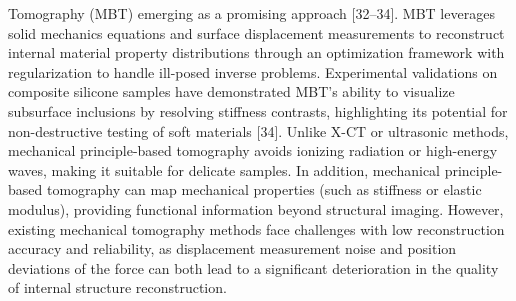 \documentclass[11pt]{article}
\begin{document}
{Tomography (MBT) emerging as a promising approach [32--34]. MBT
leverages solid mechanics equations and surface displacement
measurements to reconstruct internal material property distributions
through an optimization framework with regularization to handle
ill-posed inverse problems. Experimental validations on composite
silicone samples have demonstrated MBT's ability to visualize
subsurface inclusions by resolving stiffness contrasts, highlighting
its potential for non-destructive testing of soft materials [34].
Unlike X-CT or ultrasonic methods, mechanical principle-based
tomography avoids ionizing radiation or high-energy waves, making
it suitable for delicate samples. In addition, mechanical
principle-based tomography can map mechanical properties (such as
stiffness or elastic modulus), providing functional information
beyond structural imaging. However, existing mechanical tomography
methods face challenges with low reconstruction accuracy and
reliability, as displacement measurement noise and position
deviations of the force can both lead to a significant deterioration
in the quality of internal structure reconstruction.}
\end{document}
